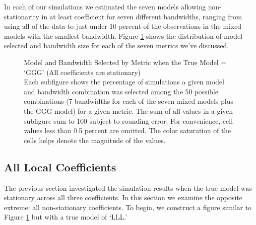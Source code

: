 \documentclass{article}\usepackage[]{graphicx}\usepackage[]{color}
\begin{document}
In each of our simulations we estimated the seven models allowing non-stationarity in at least coefficient for seven different bandwidths, ranging from using all of the data to just under 10 percent of the observations in the mixed models with the smallest bandwidth. Figure \ref{fig:GGGmodelBandwidths} shows the distribution of model selected and bandwidth size for each of the seven metrics we've discussed.



\begin{figure}
\caption{Model and Bandwidth Selected by Metric when the True Model = `GGG' (All coefficients are stationary) \\ Each subfigure shows the percentage of simulations a given model and bandwidth combination was selected among the 50 possible combinations (7 bandwidths for each of the seven mixed models plus the GGG model) for a given metric. The sum of all values in a given subfigure sum to 100 subject to rounding error. For convenience, cell values less than 0.5 percent are omitted. The color saturation of the cells helps denote the magnitude of the values.}
\label{fig:GGGmodelBandwidths}
\end{figure}

\subsection{All Local Coefficients}

The previous section investigated the simulation results when the true model was stationary across all three coefficients. In this section we examine the opposite extreme: all non-stationary coefficients. To begin, we construct a figure similar to Figure \ref{fig:GGGmodelBandwidths} but with a true model of `LLL.'   
\end{document}
